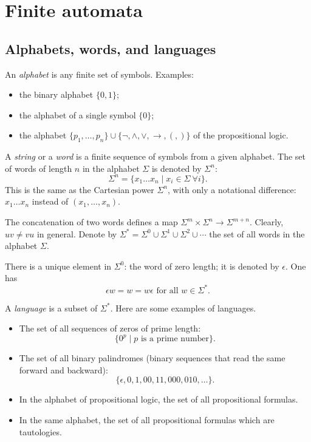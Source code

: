 \begin{page}
\setcounter{section}{1}
\setcounter{subsection}{1}
\setcounter{dfn}{0}
\label{portion:893}

\section{Finite automata}

\end{page}

\begin{page}
\setcounter{section}{1}
\setcounter{subsection}{2}
\setcounter{dfn}{0}
\label{portion:894}

\subsection{Alphabets, words, and languages}
An \emph{alphabet} is any finite set of symbols.
Examples:
\begin{itemize}
\item
the binary alphabet $\{0,1\}$;
\item
the alphabet of a single symbol $\{0\}$;
\item
the alphabet $\{p_1, \ldots, p_n\} \cup \{\neg, \wedge, \vee, \to, (, )\}$ of the propositional logic.
\end{itemize}

A \emph{string} or a \emph{word} is a finite sequence of symbols from a given alphabet.
The set of words of length $n$ in the alphabet $\Sigma$ is denoted by $\Sigma^n$:
\[
\Sigma^n = \{x_1 \ldots x_n \mid x_i \in \Sigma\ \forall i\}.
\]
This is the same as the Cartesian power $\Sigma^n$, with only a notational difference: $x_1 \ldots x_n$
instead of $(x_1, \ldots, x_n)$.

The concatenation of two words defines a map $\Sigma^m \times \Sigma^n \to \Sigma^{m+n}$.
Clearly, $uv \ne vu$ in general.
Denote by $\Sigma^* = \Sigma^0 \cup \Sigma^1 \cup \Sigma^2 \cup \cdots$ the set of all words in the alphabet $\Sigma$.

There is a unique element in $\Sigma^0$: the word of zero length; it is denoted by $\epsilon$.
One has
\[
\epsilon w = w = w\epsilon \text{ for all } w \in \Sigma^*.
\]

A \emph{language} is a subset of $\Sigma^*$.
Here are some examples of languages.

\begin{itemize}
\item
The set of all sequences of zeros of prime length:
\[
\{0^p \mid p \text{ is a prime number}\}.
\]
\item
The set of all binary palindromes (binary sequences that read the same forward and backward):
\[
\{\epsilon, 0, 1, 00, 11, 000, 010, \ldots\}.
\]
\item
In the alphabet of propositional logic, the set of all propositional formulas.
\item
In the same alphabet, the set of all propositional formulas which are tautologies.
\end{itemize}







\end{page}
